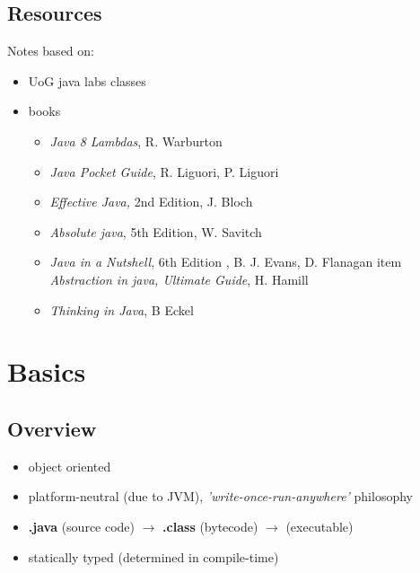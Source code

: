 \documentclass{report}
\begin{document}
\chapter{Resources}
Notes based on:
\begin{itemize}
	\item UoG java labs classes
	\item books
	\begin{itemize}
		\item \textit{Java 8 Lambdas}, R. Warburton
		\item \textit{Java Pocket Guide},  R. Liguori, P. Liguori
		\item \textit{Effective Java,} 2nd Edition, J. Bloch
		\item \textit{Absolute java}, 5th Edition, W. Savitch
		\item \textit{Java in a Nutshell}, 6th Edition , B. J. Evans, D. Flanagan
		item \textit{Abstraction in java, Ultimate Guide}, H. Hamill
		\item \textit{Thinking in Java}, B Eckel
	\end{itemize}

\end{itemize}




\part{Basics}



\chapter{Overview}

\begin{itemize}
\item object oriented

\item platform-neutral (due to JVM), \textit{'write-once-run-anywhere'} philosophy
\item \textbf{.java} (source code) $\rightarrow$ \textbf{.class} (bytecode) $\rightarrow$ (executable)

\item statically typed (determined in compile-time)
\end{itemize}
\end{document}
